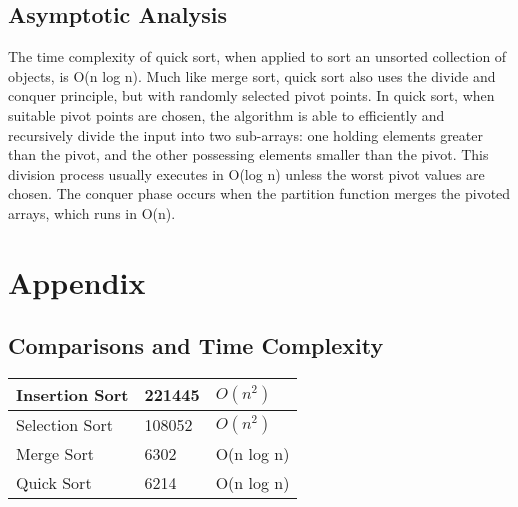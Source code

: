 \documentclass[letterpaper, 10pt,DIV=13]{scrartcl}
\numberwithin{equation}{section} %
\numberwithin{figure}{section} %
\numberwithin{table}{section} %
\begin{document}
\subsection{Asymptotic Analysis}
The time complexity of quick sort, when applied to sort an unsorted collection of objects, is O(n log n). Much like merge sort, quick sort also uses the divide and conquer principle, but with randomly selected pivot points. In quick sort, when suitable pivot points are chosen, the algorithm is able to efficiently and recursively divide the input into two sub-arrays: one holding elements greater than the pivot, and the other possessing elements smaller than the pivot. This division process usually executes in O(log n) unless the worst pivot values are chosen. The conquer phase occurs when the partition function merges the pivoted arrays, which runs in O(n).

\pagebreak


\section{Appendix}

\subsection{Comparisons and Time Complexity}
    \begin{center}
        \begin{tabular}{|l|l|l|}
            \hline
            Insertion Sort & 221445 & $O(n^2)$  \\ \hline
            Selection Sort & 108052 & $O(n^2)$ \\ \hline
            Merge Sort     & 6302 & O(n log n) \\ \hline
            Quick Sort     & 6214 & O(n log n) \\ \hline
        \end{tabular}
    \end{center}
\end{document}
